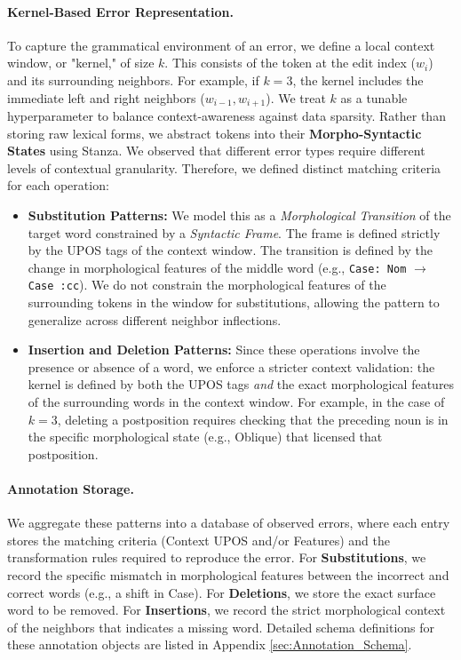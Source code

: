 \documentclass[11pt]{article}
\begin{document}
\paragraph{Kernel-Based Error Representation.}
To capture the grammatical environment of an error, we define a local context window, or "kernel," of size $k$. This consists of the token at the edit index ($w_i$) and its surrounding neighbors. For example, if $k=3$, the kernel includes the immediate left and right neighbors ($w_{i-1}, w_{i+1}$). We treat $k$ as a tunable hyperparameter to balance context-awareness against data sparsity. Rather than storing raw lexical forms, we abstract tokens into their \textbf{Morpho-Syntactic States} using Stanza.
    We observed that different error types require different levels of contextual granularity. Therefore, we defined distinct matching criteria for each operation:
\begin{itemize}
\setlength{\itemsep}{0pt}
\setlength{\parskip}{0pt}
    \item \textbf{Substitution Patterns:} We model this as a \textit{Morphological Transition} of the target word constrained by a \textit{Syntactic Frame}. The frame is defined strictly by the UPOS tags of the context window. The transition is defined by the change in morphological features of the middle word (e.g., \texttt{Case: Nom} $\rightarrow$ \texttt{Case :cc}). We do not constrain the morphological features of the surrounding tokens in the window for substitutions, allowing the pattern to generalize across different neighbor inflections.
    
    \item \textbf{Insertion and Deletion Patterns:} Since these operations involve the presence or absence of a word, we enforce a stricter context validation: the kernel is defined by both the UPOS tags \textit{and} the exact morphological features of the surrounding words in the context window. For example, in the case of $k=3$, deleting a postposition requires checking that the preceding noun is in the specific morphological state (e.g., Oblique) that licensed that postposition.
\end{itemize}

\paragraph{Annotation Storage.}
We aggregate these patterns into a database of observed errors, where each entry stores the matching criteria (Context UPOS and/or Features) and the transformation rules required to reproduce the error. For \textbf{Substitutions}, we record the specific mismatch in morphological features between the incorrect and correct words (e.g., a shift in Case). For \textbf{Deletions}, we store the exact surface word to be removed. For \textbf{Insertions}, we record the strict morphological context of the neighbors that indicates a missing word. Detailed schema definitions for these annotation objects are listed in Appendix \ref{sec:Annotation_Schema}.
\end{document}
